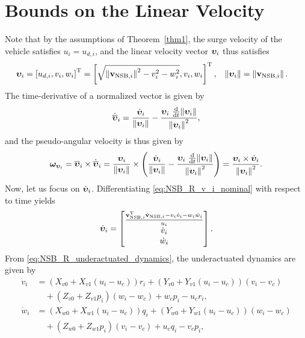 \section{Bounds on the Linear Velocity}
\label{app:omega_v}
Note that by the assumptions of Theorem~\ref{thm1}, the surge velocity of the vehicle satisfies $u_i = u_{d, i}$, and the linear velocity vector $\bm{\upsilon}_i$ thus  satisfies
\begin{align}
    \bm{\upsilon}_i &= \left[u_{d,i}, v_i, w_i\right]^{\mathrm{T}} = \left[\sqrt{\left\|\mathbf{v}_{{\rm NSB}, i}\right\|^2 - v_i^2 - w_i^2}, v_i, w_i\right]^{\mathrm{T}}, &
    \left\|\bm{\upsilon}_i\right\| &= \left\|\mathbf{v}_{{\rm NSB}, i}\right\|.
    \label{eq:NSB_R_v_i_nominal}
\end{align}
The time-derivative of a normalized vector is given by
\begin{equation}
    \dot{\overline{\bm{\upsilon}}}_i = \frac{\dot{\bm{\upsilon}}_i}{\left\|\bm{\upsilon}_i\right\|} - \frac{\bm{\upsilon}_i\,\,\frac{\rm d}{{\rm d}t}\!\left\|\bm{\upsilon}_i\right\|}{\left\|\bm{\upsilon}_i\right\|^2},
\end{equation}
and the pseudo-angular velocity is thus given by
\begin{equation}
    \bm{\omega}_{\bm{\upsilon}_i} = \overline{\bm{\upsilon}}_i \times \dot{\overline{\bm{\upsilon}}}_i
    = \frac{\bm{\upsilon}_i}{\left\|\bm{\upsilon}_i\right\|} \times 
        \left(\frac{\dot{\bm{\upsilon}}_i}{\left\|\bm{\upsilon}_i\right\|} - \frac{\bm{\upsilon}_i\,\,\frac{\rm d}{{\rm d}t}\!\left\|\bm{\upsilon}_i\right\|}{\left\|\bm{\upsilon}_i\right\|^2}\right)
    = \frac{\bm{\upsilon}_i \times \dot{\bm{\upsilon}}_i}{\left\|\bm{\upsilon}_i\right\|^2}.
    \label{eq:NSB_R_omega_v_a1}
\end{equation}
Now, let us focus on $\dot{\bm{\upsilon}}_i$.
Differentiating \eqref{eq:NSB_R_v_i_nominal} with respect to time yields
\begin{equation}
    \dot{\bm{\upsilon}}_i = \begin{bmatrix}
        \frac{\mathbf{v}_{{\rm NSB}, i}^{\mathrm{T}}\dot{\mathbf{v}}_{{\rm NSB}, i} - v_i\dot{v}_i - w_i\dot{w}_i}{u_i} \\
        \dot{v}_i \\
        \dot{w}_i
    \end{bmatrix}.
    \label{eq:NSB_R_v_i_dot}
\end{equation}
From \eqref{eq:NSB_R_underactuated_dynamics}, the underactuated dynamics are given by
\begin{subequations}
    \begin{align}
        \dot{v}_i &= \left(X_{v0} + X_{v1}(u_i-u_c)\right)r_i + \left(Y_{v0} + Y_{v1}(u_i-u_c)\right)(v_i-v_c) \nonumber \\
        &\quad + \left(Z_{v0} + Z_{v1}p_i\right)(w_i-w_c) + w_cp_i - u_cr_i, \\
        \dot{w}_i &= \left(X_{w0} + X_{w1}(u_i-u_c)\right)q_i + \left(Y_{w0} + Y_{w1}(u_i-u_c)\right)(w_i-w_c) \nonumber \\
        &\quad + \left(Z_{w0} + Z_{w1}p_i\right)(v_i-v_c) + u_cq_i - v_cp_i,
    \end{align}
    \label{eq:NSB_R_underactuated_dynamics_expanded}
\end{subequations}
